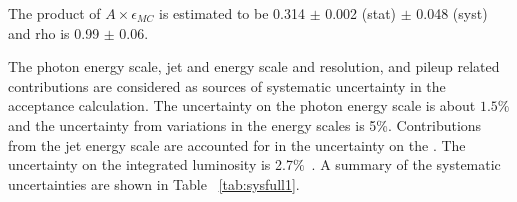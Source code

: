The product of $A\times\epsilon_{MC}$ is estimated to be
 0.314 $\pm$ 0.002 (stat) $\pm$ 0.048 (syst) and rho is 0.99 $\pm$ 0.06.


The photon energy scale, jet and \met energy scale and resolution,
 and pileup related contributions are considered as
 sources of systematic uncertainty in the acceptance calculation.
The uncertainty on the photon energy scale is about $1.5\%$
 and the uncertainty from variations in the \met energy scales is 5\%.
Contributions from the jet energy scale are accounted for in the  uncertainty on  
the \met. 
The uncertainty on the integrated luminosity is 2.7$\%$~\cite{ref:CMSLumiCalc}.
A summary of the systematic uncertainties are shown in Table ~\ref{tab:sysfull1}.

\begin{table}[htbp]
\caption[Systematic uncertainties in \pploneg]{Summary of systematic uncertainties for signal and different background sources, shown in \%.}
\centering
{}
\label{tab:sysfull1}%
\end{table}

